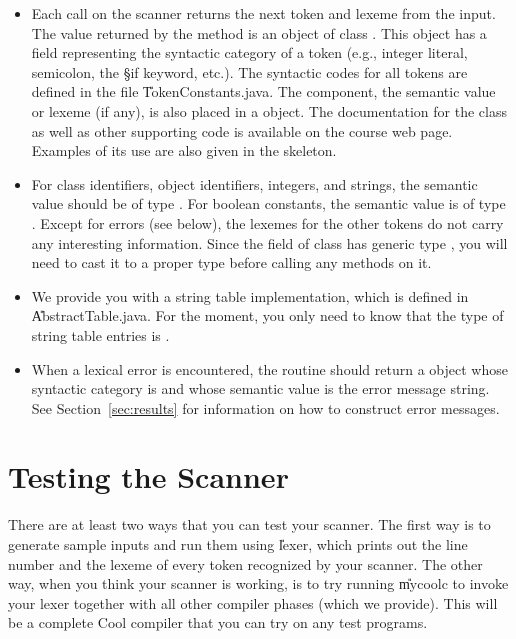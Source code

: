 \documentclass[11pt]{article}
\begin{document}
\begin{itemize}

\item
Each call on the scanner returns the next token and lexeme from the
input.  The value returned by the method  is an
object of class .  This object has a field
representing the syntactic category of a token (e.g.,
integer literal, semicolon, the \S{if} keyword, etc.). The syntactic codes
for all tokens are defined in the file \U{TokenConstants.java}. The
component, the semantic value or lexeme (if any), is also placed in a
 object.  The documentation for the class
 as well as other supporting code is
available on the course web page.  Examples of its use are also given
in the skeleton.

\item
For class identifiers, object identifiers, integers, and strings, the
semantic value should be of type .  For boolean constants,
the semantic value is of type . 
Except for errors
(see below), the lexemes for the other tokens do not carry any
interesting information.  Since the  field of class
 has generic type ,
you will need to cast it to a proper type before calling any methods
on it.

\item
We provide you with a string table implementation, which is defined in
\U{AbstractTable.java}. 
For the moment, you only need to know
that the type of string table entries is .

\item
When a lexical error is encountered, the routine
 should return a  object
whose syntactic category is  and whose semantic
value is the error message string.  See Section~\ref{sec:results} for
information on how to construct error messages.

\end{itemize}

\section{Testing the Scanner}

There are at least two ways that you can test your scanner.  The first
way is to generate sample inputs and run them using \U{lexer}, which
prints out the line number and the lexeme of every token recognized by
your scanner.  The other way, when you think your scanner is working,
is to try running \U{mycoolc} to invoke your lexer together with all
other compiler phases (which we provide).  This will be a complete
Cool compiler that you can try on any test programs.
\end{document}
